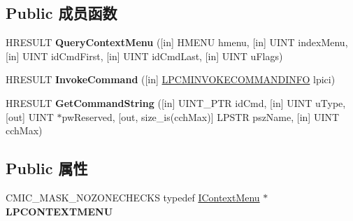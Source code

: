 \subsection*{Public 成员函数}
\begin{DoxyCompactItemize}
\item 
\mbox{\label{interface_i_context_menu_ae3052da9370f2fc187e82b4fba5f4eec}} 
H\+R\+E\+S\+U\+LT {\bfseries Query\+Context\+Menu} (\mbox{[}in\mbox{]} H\+M\+E\+NU hmenu, \mbox{[}in\mbox{]} U\+I\+NT index\+Menu, \mbox{[}in\mbox{]} U\+I\+NT id\+Cmd\+First, \mbox{[}in\mbox{]} U\+I\+NT id\+Cmd\+Last, \mbox{[}in\mbox{]} U\+I\+NT u\+Flags)
\item 
\mbox{\label{interface_i_context_menu_ade74db144b76578c5f2fa44c90acc840}} 
H\+R\+E\+S\+U\+LT {\bfseries Invoke\+Command} (\mbox{[}in\mbox{]} \hyperlink{struct_i_context_menu_1_1tag_c_m_i_n_v_o_k_e_c_o_m_m_a_n_d_i_n_f_o}{L\+P\+C\+M\+I\+N\+V\+O\+K\+E\+C\+O\+M\+M\+A\+N\+D\+I\+N\+FO} lpici)
\item 
\mbox{\label{interface_i_context_menu_a855de96793bb6310ae37c264fb89ef96}} 
H\+R\+E\+S\+U\+LT {\bfseries Get\+Command\+String} (\mbox{[}in\mbox{]} U\+I\+N\+T\+\_\+\+P\+TR id\+Cmd, \mbox{[}in\mbox{]} U\+I\+NT u\+Type, \mbox{[}out\mbox{]} U\+I\+NT $\ast$pw\+Reserved, \mbox{[}out, size\+\_\+is(cch\+Max)\mbox{]} L\+P\+S\+TR psz\+Name, \mbox{[}in\mbox{]} U\+I\+NT cch\+Max)
\end{DoxyCompactItemize}
\subsection*{Public 属性}
\begin{DoxyCompactItemize}
\item 
\mbox{\label{interface_i_context_menu_a798ca5dcb3ddf5a9491f579354b8ad95}} 
C\+M\+I\+C\+\_\+\+M\+A\+S\+K\+\_\+\+N\+O\+Z\+O\+N\+E\+C\+H\+E\+C\+KS typedef \hyperlink{interface_i_context_menu}{I\+Context\+Menu} $\ast$ {\bfseries L\+P\+C\+O\+N\+T\+E\+X\+T\+M\+E\+NU}
\end{DoxyCompactItemize}
